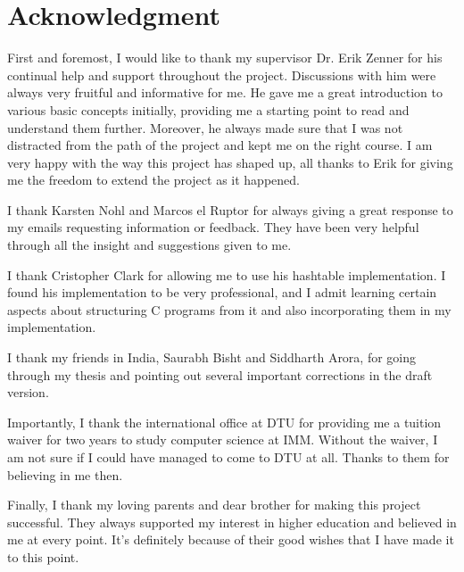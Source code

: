 
\chapter*{Acknowledgment}

First and foremost, I would like to thank my supervisor Dr. Erik Zenner for his continual help and support throughout the project. Discussions with him were always very fruitful and informative for me. He gave me a great introduction to various basic concepts initially, providing me a starting point to read and understand them further. Moreover, he always made sure that I was not distracted from the path of the project and kept me on the right course. I am very happy with the way this project has shaped up, all thanks to Erik for giving me the freedom to extend the project as it happened. 

I thank Karsten Nohl and Marcos el Ruptor for always giving a great response to my emails requesting information or feedback. They have been very helpful through all the insight and suggestions given to me. 

I thank Cristopher Clark for allowing me to use his hashtable implementation. I found his implementation to be very professional, and I admit learning certain aspects about structuring C programs from it and also incorporating them in my implementation. 

I thank my friends in India, Saurabh Bisht and Siddharth Arora, for going through my thesis and pointing out several important corrections in the draft version.

Importantly, I thank the international office at DTU for providing me a tuition waiver for two years to study computer science at IMM. Without the waiver, I am not sure if I could have managed to come to DTU at all. Thanks to them for believing in me then.

Finally, I thank my loving parents and dear brother for making this project successful. They always supported my interest in higher education and believed in me at every point. It's definitely because of their good wishes that I have made it to this point. 